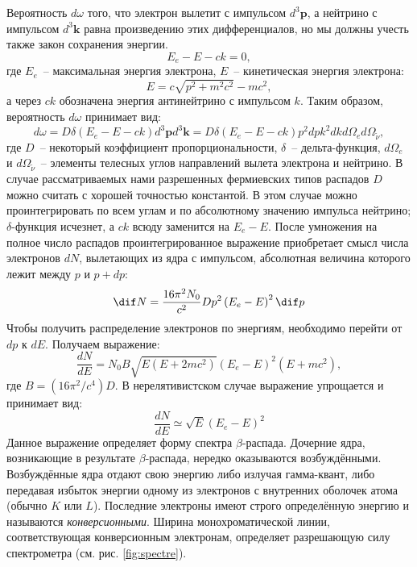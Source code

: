 \documentclass[a4paper,12pt]{article} %
\begin{document}
Вероятность $d\omega$ того, что электрон вылетит с импульсом $d^3\mathbf{p}$, а нейтрино с импульсом $d^3\mathbf{k}$ равна произведению этих дифференциалов, но мы должны учесть также закон сохранения энергии.
\begin{equation}
    E_e - E - ck = 0,
\end{equation}
где $E_e$~-- максимальная энергия электрона, $E$~-- кинетическая энергия электрона:
\begin{equation}
    E = c\sqrt{p^2 + m^2c^2} -mc^2,
\end{equation}
а через $ck$ обозначена энергия антинейтрино с импульсом $k$. Таким образом, вероятность $d\omega$ принимает вид:
\begin{equation}
    d\omega = D\delta(E_e-E-ck)d^3\mathbf{p}d^3\mathbf{k} = D\delta(E_e-E-ck)p^2d pk^2d kd\Omega_ed\Omega_{\widetilde{\nu}},
\end{equation}
где $D$~-- некоторый коэффициент пропорциональности, $\delta$~-- дельта-функция, $d\Omega_e$ и $d\Omega_{\widetilde{\nu}}$~-- элементы телесных углов направлений вылета электрона и нейтрино. В случае рассматриваемых нами разрешенных фермиевских типов распадов $D$ можно считать с хорошей точностью константой. В этом случае можно проинтегрировать по всем углам и по абсолютному значению импульса нейтрино; $\delta$-функция исчезнет, а $ck$ всюду заменится на $E_e-E$. После умножения на полное число распадов проинтегрированное выражение приобретает смысл числа электронов $dN$, вылетающих из ядра с импульсом, абсолютная величина которого лежит между $p$ и $p +dp$:
\begin{equation}
    \dif N = \frac{16\pi^2N_0}{c^2} D p^2\left(E_e-E\right)^2\dif p
\end{equation}
Чтобы получить распределение электронов по энергиям, необходимо перейти от $dp$ к $dE$. Получаем выражение:
\begin{equation}
    \frac{dN}{dE} = N_0B\sqrt{E(E+2mc^2)}(E_e - E)^2(E+mc^2),
\end{equation}
где $B = (16\pi^2/c^4)D$. В нерелятивистском случае выражение упрощается и принимает вид:
\begin{equation}
    \frac{d N}{d E} \simeq \sqrt{E}(E_e - E)^2
\end{equation}
Данное выражение определяет форму спектра $\beta$-распада. Дочерние ядра, возникающие в результате $\beta$-распада, нередко оказываются возбуждёнными. Возбуждённые ядра отдают свою энергию либо излучая гамма-квант, либо передавая избыток энергии одному из электронов с внутренних оболочек атома (обычно $K$ или $L$). Последние электроны имеют строго определённую энергию и называются \textit{конверсионными}. Ширина монохроматической линии, соответствующая конверсионным электронам, определяет разрешающую силу спектрометра (см. рис. \ref{fig:spectre}).
\end{document}
